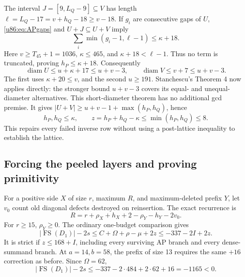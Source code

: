 \documentclass[11pt,a4paper]{article}
\theoremstyle{remark}
\newcommand{\FS}{\operatorname{FS}}
\begin{document}
The interval $J=[9,L_Q-9]\subseteq V$ has length
$\ell=L_Q-17=v+h_Q-18\ge v-18$.
If $g_i$ are consecutive gaps of $U$, \eqref{u86:eq:APgaps} and
$U+J\subseteq U+V$ imply
\[
 \sum_i\min(g_i-1,\ell-1)\le\kappa+18.
\]
Here $v\ge T_{45}+1=1036$, $\kappa\le465$, and
$\kappa+18<\ell-1$. Thus no term is truncated, proving
$h_P\le\kappa+18$. Consequently
\[
 \operatorname{diam}U\le u+\kappa+17\le u+v-3,
 \qquad \operatorname{diam}V\le v+7\le u+v-3.
\]
The first uses $\kappa+20\le v$, and the second $u\ge191$.
Stanchescu's Theorem 4 now applies directly: the stronger bound
$u+v-3$ covers its equal- and unequal-diameter alternatives.
This short-diameter theorem has no additional gcd premise.
It gives $|U+V|\ge u+v-1+\max(h_P,h_Q)$, hence
\[
 h_P,h_Q\le\kappa,\qquad
 z=h_P+h_Q-\kappa\le\min(h_P,h_Q)\le8.
\]
This repairs every failed inverse row without using a post-lattice
inequality to establish the lattice.

\subsection{Forcing the peeled layers and proving primitivity}
For a positive side $X$ of size $r$, maximum $R$, and maximum-deleted
prefix $Y$, let $v_0$ count old diagonal defects destroyed on reinsertion.
The exact recurrence is
\begin{equation}\label{u86:eq:removedmax89}
 R=r+\rho_X+h_X+2-\rho_Y-h_Y-2v_0.
\end{equation}
For $r\ge15$, $\rho_Y\ge0$. The ordinary one-budget comparison gives
\begin{equation}\label{u86:eq:D1ordinary89}
 |\FS(D_1)|-2s\le C+\Omega+\rho-\mu+2z
                 \le-337-2I+2z.
\end{equation}
It is strict if $z\le168+I$, including every surviving AP branch and
every dense-summand branch. At $a=14,b=58$, the prefix of size 13
requires the same $+16$ correction as before. Since $\Omega=62$,
\[
 |\FS(D_1)|-2s\le-337-2\cdot484+2\cdot62+16=-1165<0.
\]
\end{document}
